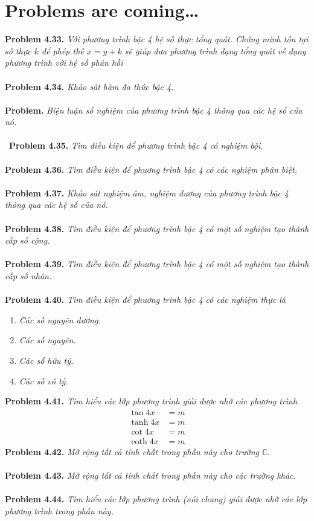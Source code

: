 \documentclass[a4paper,oneside]{book}
\numberwithin{equation}{chapter}
\begin{document}
\section{Problems are coming\ldots}
\textbf{Problem 4.33.} \textit{Với phương trình bậc 4 hệ số thực tổng quát. Chứng minh tồn tại số thực $k$ để phép thế $x=y+k$ sẽ giúp đưa phương trình dạng tổng quát về dạng phương trình với hệ số phản hồi}\\
\\
\textbf{Problem 4.34.} \textit{Khảo sát hàm đa thức bậc 4.}\\
\\
\textbf{Problem.} \textit{Biện luận số nghiệm của phương trình bậc 4 thông qua các hệ số của nó.}\\
\\\
\textbf{Problem 4.35.} \textit{Tìm điều kiện để phương trình bậc 4 có nghiệm bội.}\\
\\
\textbf{Problem 4.36.} \textit{Tìm điều kiện để phương trình bậc 4 có các nghiệm phân biệt.}\\
\\
\textbf{Problem 4.37.} \textit{Khảo sát nghiệm âm, nghiệm dương của phương trình bậc 4 thông qua các hệ số của nó.}\\
\\
\textbf{Problem 4.38.} \textit{Tìm điều kiện để phương trình bậc 4 có một số nghiệm tạo thành cấp số cộng.}\\
\\
\textbf{Problem 4.39.} \textit{Tìm điều kiện để phương trình bậc 4 có một số nghiệm tạo thành cấp số nhân.}\\
\\
\textbf{Problem 4.40.} \textit{Tìm điều kiện để phương trình bậc 4 có các nghiệm thực là}
\begin{enumerate}
\item \textit{Các số nguyên dương.}
\item \textit{Các số nguyên.}
\item \textit{Các số hữu tỷ.}
\item \textit{Các số vô tỷ.}
\end{enumerate}
\textbf{Problem 4.41.} \textit{Tìm hiểu các lớp phương trình giải được nhờ các phương trình}
\begin{align}
\tan 4x &= m\\
\tanh 4x &= m\\
\cot 4x &= m\\
\coth 4x &= m
\end{align}
\textbf{Problem 4.42.} \textit{Mở rộng tất cả tính chất trong phần này cho trường $\mathbb{C}$}.\\
\\
\textbf{Problem 4.43.} \textit{Mở rộng tất cả tính chất trong phần này cho các trường khác.}\\
\\
\textbf{Problem 4.44.} \textit{Tìm hiểu các lớp phương trình (nói chung) giải được nhờ các lớp phương trình trong phần này.}
\end{document}
